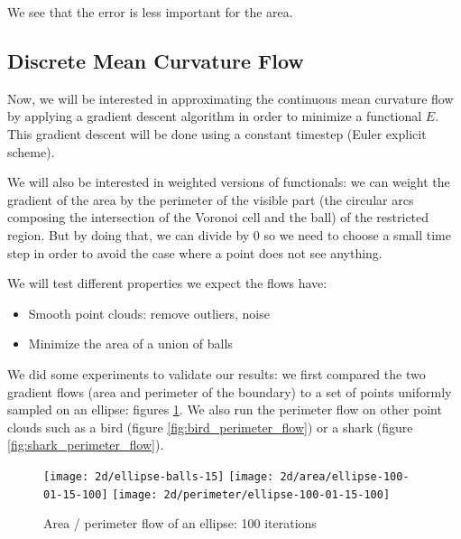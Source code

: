 We see that the error is less important for the area.

\subsection{Discrete Mean Curvature Flow}

Now, we will be interested in approximating the continuous mean curvature flow
by applying a gradient descent algorithm in order to minimize a functional $ E
$. This gradient descent will be done using a constant timestep (Euler explicit
scheme).

We will also be interested in weighted versions of functionals: we can weight
the gradient of the area by the perimeter of the visible part (the circular arcs
composing the intersection of the Voronoi cell and the ball) of the restricted
region. But by doing that, we can divide by $ 0 $ so we need to choose a small
time step in order to avoid the case where a point does not see anything.

We will test different properties we expect the flows have:
\begin{itemize}
    \item Smooth point clouds: remove outliers, noise
    \item Minimize the area of a union of balls
\end{itemize}


We did some experiments to validate our results: we first compared the two
gradient flows (area and perimeter of the boundary) to a set of points uniformly
sampled on an ellipse: figures \ref{fig:ellipse_flows}. We also run the
perimeter flow on other point clouds such as a bird (figure
\ref{fig:bird_perimeter_flow}) or a shark (figure
\ref{fig:shark_perimeter_flow}).

\begin{figure}[h]
    \centering

    \texttt{[image: 2d/ellipse-balls-15]}
    \texttt{[image: 2d/area/ellipse-100-01-15-100]}
    \texttt{[image: 2d/perimeter/ellipse-100-01-15-100]}
    \caption{Area / perimeter flow of an ellipse: 100 iterations}
    \label{fig:ellipse_flows}
\end{figure}

